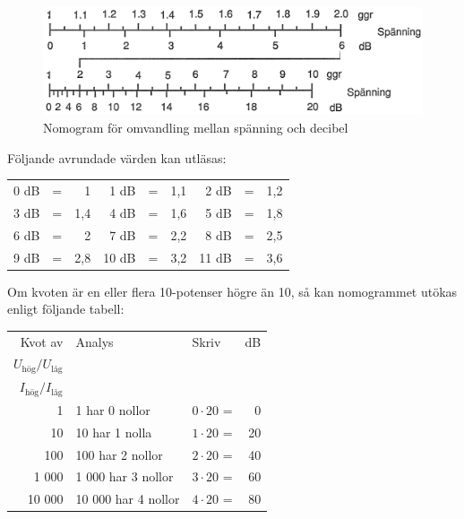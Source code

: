 \begin{figure}
  \includegraphics[width=\textwidth]{images/nomogram_db_spanning.png}
  \caption{Nomogram för omvandling mellan spänning och decibel}
  \label{ellära-nomogram-db-spänning}
\end{figure}

Följande avrundade värden kan utläsas:

\vspace{\baselineskip}

\begin{tabular}{rcr|rcr|rcr}
	0 dB & = &   1 &  1 dB & = & 1,1 &  2 dB & = & 1,2 \\
	3 dB & = & 1,4 &  4 dB & = & 1,6 &  5 dB & = & 1,8 \\
	6 dB & = &   2 &  7 dB & = & 2,2 &  8 dB & = & 2,5 \\
	9 dB & = & 2,8 & 10 dB & = & 3,2 & 11 dB & = & 3,6
\end{tabular}

\vspace{\baselineskip}


Om kvoten är en eller flera 10-potenser högre än 10, så kan nomogrammet utökas
enligt följande tabell:

\vspace{\baselineskip}

\begin{tabular}{rllr}
Kvot av & Analys             & Skriv            & dB \\
\(U_\text{hög}/U_\text{låg}\) &          &                  &    \\
\(I_\text{hög}/I_\text{låg}\) &          &                  &    \\
     1 & 1 har 0 nollor      & \(0 \cdot 20\) = &  0 \\
    10 & 10 har 1 nolla      & \(1 \cdot 20\) = & 20 \\
   100 & 100 har 2 nollor    & \(2 \cdot 20\) = & 40 \\
 1 000 &  1 000 har 3 nollor & \(3 \cdot 20\) = & 60 \\
10 000 & 10 000 har 4 nollor & \(4 \cdot 20\) = & 80
\end{tabular}

